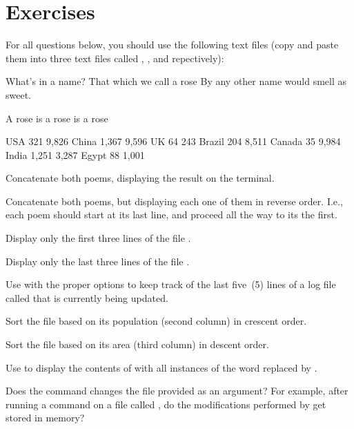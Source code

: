 \section*{Exercises}

For all questions below, you should use the following text files (copy and paste them into three text files called ,  , and  repectively):

\begin{command_line}[make]
What's in a name? That which we call a rose
By any other name would smell as sweet.
\end{command_line}

\begin{command_line}[Bash]
A rose is a rose is a rose
\end{command_line}

\begin{command_line}[Bash]
USA     321     9,826
China   1,367   9,596
UK      64      243
Brazil  204     8,511
Canada  35      9,984
India   1,251   3,287
Egypt   88      1,001
\end{command_line}

\begin{exercises}
  \item Concatenate both poems, displaying the result on the terminal.
  \item Concatenate both poems, but displaying each one of them in reverse order. I.e., each poem should start at its last line, and proceed all the way to its the first.
  \item Display only the first three lines of the file .
  \item Display only the last three lines of the file .
  \item Use  with the proper options to keep track of the last five~(5) lines of a log file called  that is currently being updated.
  \item Sort the  file based on its population (second column) in crescent order.
  \item Sort the  file based on its area (third column) in descent order.
  \item Use  to display the contents of  with all instances of the word  replaced by .
  \item Does the  command changes the file provided as an argument? For example, after running a  command on a file called , do the modifications performed by  get stored in memory?
\end{exercises}
